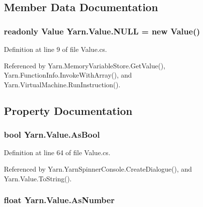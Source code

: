 \subsection{Member Data Documentation}
\hypertarget{a00167_a1ed2964965baca8621c45efa23f37660}{
\subsubsection[{N\-U\-L\-L}]{\setlength{\rightskip}{0pt plus 5cm}readonly {\bf Value} Yarn.\-Value.\-N\-U\-L\-L = new {\bf Value}()\hspace{0.3cm}{\ttfamily [static]}}}\label{a00167_a1ed2964965baca8621c45efa23f37660}


Definition at line 9 of file Value.\-cs.



Referenced by Yarn.\-Memory\-Variable\-Store.\-Get\-Value(), Yarn.\-Function\-Info.\-Invoke\-With\-Array(), and Yarn.\-Virtual\-Machine.\-Run\-Instruction().



\subsection{Property Documentation}
\hypertarget{a00167_a5805faef3b3d376090ff096d6dd6c064}{
\subsubsection[{As\-Bool}]{\setlength{\rightskip}{0pt plus 5cm}bool Yarn.\-Value.\-As\-Bool\hspace{0.3cm}{\ttfamily [get]}}}\label{a00167_a5805faef3b3d376090ff096d6dd6c064}


Definition at line 64 of file Value.\-cs.



Referenced by Yarn.\-Yarn\-Spinner\-Console.\-Create\-Dialogue(), and Yarn.\-Value.\-To\-String().

\hypertarget{a00167_a751419743761562bf902246d6e6a3c0a}{
\subsubsection[{As\-Number}]{\setlength{\rightskip}{0pt plus 5cm}float Yarn.\-Value.\-As\-Number\hspace{0.3cm}{\ttfamily [get]}}}\label{a00167_a751419743761562bf902246d6e6a3c0a}


